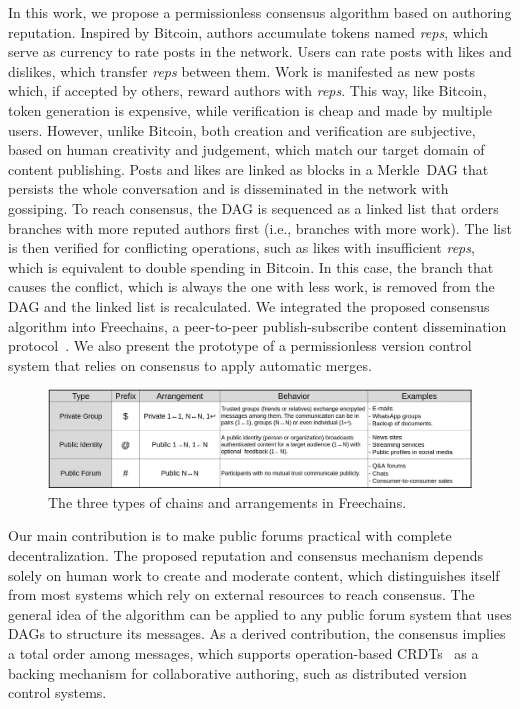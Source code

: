 \documentclass[10pt,journal,compsoc]{IEEEtran}
\newcommand{\FC}       {Freechains\xspace}
\newcommand{\reps}     {\emph{reps}\xspace}
\begin{document}
In this work, we propose a permissionless consensus algorithm based on
authoring reputation.
Inspired by Bitcoin, authors accumulate tokens named \reps, which serve as
currency to rate posts in the network.
Users can rate posts with likes and dislikes, which transfer \reps between
them.
Work is manifested as new posts which, if accepted by others, reward authors
with \reps.
This way, like Bitcoin, token generation is expensive, while verification is
cheap and made by multiple users.
However, unlike Bitcoin, both creation and verification are subjective, based
on human creativity and judgement, which match our target domain of content
publishing.
Posts and likes are linked as blocks in a Merkle~DAG that persists the whole
conversation and is disseminated in the network with gossiping.
To reach consensus, the DAG is sequenced as a linked list that orders branches
with more reputed authors first (i.e., branches with more work).
The list is then verified for conflicting operations, such as likes with
insufficient \reps, which is equivalent to double spending in Bitcoin.
In this case, the branch that causes the conflict, which is always the one with
less work, is removed from the DAG and the linked list is recalculated.
We integrated the proposed consensus algorithm into Freechains, a peer-to-peer
publish-subscribe content dissemination protocol~\cite{fcs.sbseg20}.
We also present the prototype of a permissionless version control system that
relies on consensus to apply automatic merges.

\begin{figure}
\centering
\includegraphics[width=\textwidth]{arrangements.png}
\caption{The three types of chains and arrangements in \FC.}
\label{fig.table}
\end{figure}

Our main contribution is to make public forums practical with complete
decentralization.
The proposed reputation and consensus mechanism depends solely on human work to
create and moderate content, which distinguishes itself from most systems which
rely on external resources to reach consensus.
The general idea of the algorithm can be applied to any public forum system
that uses DAGs to structure its messages.
As a derived contribution, the consensus implies a total order among messages,
which supports operation-based CRDTs~\cite{merkle.crdts} as a backing mechanism
for collaborative authoring, such as distributed version control systems.
\end{document}
